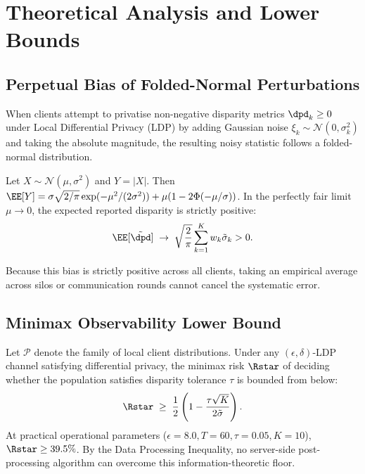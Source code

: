 \section{Theoretical Analysis and Lower Bounds}
\label{sec:theory}

\subsection{Perpetual Bias of Folded-Normal Perturbations}
When clients attempt to privatise non-negative disparity metrics $\dpd_k \ge 0$ under Local Differential Privacy (LDP) by adding Gaussian noise $\xi_k \sim \mathcal{N}(0, \sigma_k^2)$ and taking the absolute magnitude, the resulting noisy statistic follows a folded-normal distribution.
\begin{lemma}
\label{lem:folded_normal}
Let $X \sim \mathcal{N}(\mu, \sigma^2)$ and $Y = |X|$. Then $\EE[Y] = \sigma \sqrt{2/\pi} \exp(-\mu^2 / (2\sigma^2)) + \mu (1 - 2\Phi(-\mu/\sigma))$. In the perfectly fair limit $\mu \to 0$, the expected reported disparity is strictly positive:
\begin{equation}
\EE[\tilde{\dpd}] \;\to\; \sqrt{\frac{2}{\pi}} \sum_{k=1}^K w_k \tilde{\sigma}_k > 0.
\end{equation}
\end{lemma}
Because this bias is strictly positive across all clients, taking an empirical average across silos or communication rounds cannot cancel the systematic error.

\subsection{Minimax Observability Lower Bound}
\begin{theorem}
\label{thm:minimax_lecam}
Let $\mathcal{P}$ denote the family of local client distributions. Under any $(\epsilon, \delta)$-LDP channel satisfying differential privacy, the minimax risk $\Rstar$ of deciding whether the population satisfies disparity tolerance $\tau$ is bounded from below:
\begin{equation}
\Rstar \;\ge\; \frac{1}{2} \left( 1 - \frac{\tau \sqrt{K}}{2 \tilde{\sigma}} \right).
\end{equation}
At practical operational parameters ($\epsilon = 8.0, T = 60, \tau = 0.05, K = 10$), $\Rstar \ge 39.5\%$. By the Data Processing Inequality, no server-side post-processing algorithm can overcome this information-theoretic floor.
\end{theorem}

